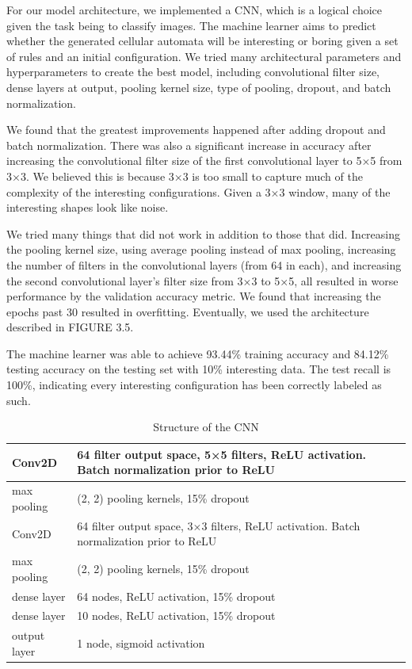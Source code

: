 \documentclass[12pt]{article}
\numberwithin{figure}{section} %
\begin{document}
For our model architecture, we implemented a CNN, which is a logical choice given the task being to classify images. The machine learner aims to predict whether the generated cellular automata will be interesting or boring given a set of rules and an initial configuration. We tried many architectural parameters and hyperparameters to create the best model, including convolutional filter size, dense layers at output, pooling kernel size, type of pooling, dropout, and batch normalization. 

We found that the greatest improvements happened after adding dropout and batch normalization. There was also a significant increase in accuracy after increasing the convolutional filter size of the first convolutional layer to 5×5 from 3×3. We believed this is because 3×3 is too small to capture much of the complexity of the interesting configurations. Given a 3×3 window, many of the interesting shapes look like noise.

We tried many things that did not work in addition to those that did. Increasing the pooling kernel size, using average pooling instead of max pooling, increasing the number of filters in the convolutional layers (from 64 in each), and increasing the second convolutional layer’s filter size from 3×3 to 5×5, all resulted in worse performance by the validation accuracy metric. We found that increasing the epochs past 30 resulted in overfitting. Eventually, we used the architecture described in FIGURE 3.5.

The machine learner was able to achieve 93.44\% training accuracy and 84.12\% testing accuracy on the testing set with 10\% interesting data. The test recall is 100\%, indicating every interesting configuration has been correctly labeled as such. 

\begin{table}[H]
\begin{center}
\begin{tabular}{ | m{2cm} | m{8cm} | } 
\hline
Conv2D & 64 filter output space, 5×5 filters, ReLU activation. Batch normalization prior to ReLU \\ 
\hline
max pooling & (2, 2) pooling kernels, 15\% dropout  \\ 
\hline
Conv2D & 64 filter output space, 3×3 filters, ReLU activation. Batch normalization prior to ReLU  \\ 
\hline
max pooling & (2, 2) pooling kernels, 15\% dropout \\ 
\hline
dense layer & 64 nodes, ReLU activation, 15\% dropout  \\ 
\hline
dense layer & 10 nodes, ReLU activation, 15\% dropout  \\ 
\hline
output layer & 1 node, sigmoid activation \\
\hline
\end{tabular}
\caption{Structure of the CNN}
\vspace{-1.5em}
\end{center}
\end{table}
\end{document}
